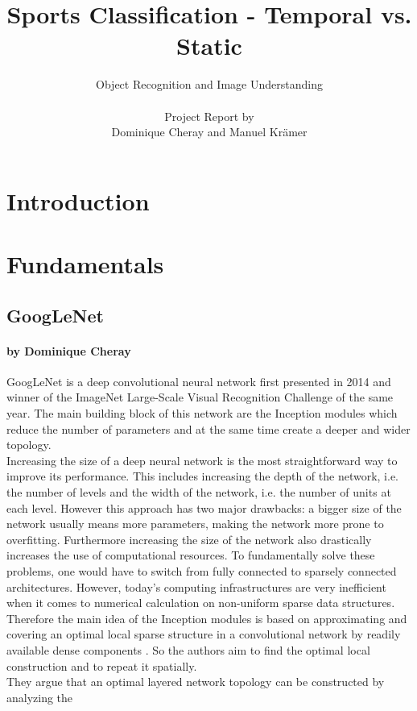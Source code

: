\documentclass[11pt]{report}
\title{\textbf{Sports Classification - Temporal vs. Static}}
\author{Object Recognition and Image Understanding \\ \\
  Project Report by \\
  Dominique Cheray and Manuel Krämer}
\begin{document}
\maketitle

\tableofcontents
 
\chapter{Introduction}

\chapter{Fundamentals}
\section{GoogLeNet}
\subsubsection{by Dominique Cheray}
GoogLeNet is a deep convolutional neural network first presented in 2014 and
winner of the ImageNet Large-Scale Visual Recognition Challenge of the same
year. The main building block of this network are the Inception modules which
reduce the number of parameters and at the same time create a deeper and wider
topology. \\
Increasing the size of a deep neural network is the most straightforward way to
improve its performance. This includes increasing the depth of the network, i.e.
the number of levels and the width of the network, i.e. the number of units at
each level. However this approach has two major drawbacks: a bigger size of the
network usually means more parameters, making the network more prone to
overfitting. Furthermore increasing the size of the network also drastically
increases the use of computational resources. To fundamentally solve these
problems, one would have to switch from fully connected to sparsely connected
architectures. However, today's computing infrastructures are very inefficient
when it comes to numerical calculation on non-uniform sparse data structures.
Therefore the main idea of the Inception modules is based on approximating and covering an
optimal local sparse structure in a convolutional network by readily available dense
components \cite{szegedy2015going}. So the authors aim to find the optimal local
construction and to repeat it spatially. \\
They argue that an optimal layered network topology can be constructed by analyzing the
\end{document}
